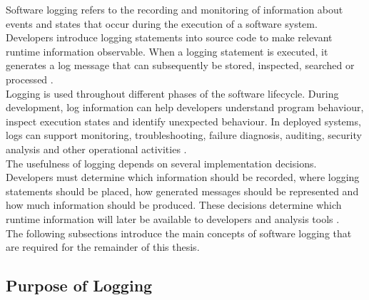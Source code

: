Software logging refers to the recording and monitoring of information about events and states that occur during the execution of a software system. 
Developers introduce logging statements into source code to make relevant runtime information observable.
When a logging statement is executed, it generates a log message that can subsequently be stored, inspected, searched or processed 
\cite{chen2021asurveyofsoftwareloginstrumentation}.
\\
Logging is used throughout different phases of the software lifecycle. During development, 
log information can help developers understand program behaviour, inspect execution states and identify unexpected behaviour. 
In deployed systems, logs can support monitoring, troubleshooting, failure diagnosis, auditing, security analysis
and other operational activities \cite{chen2021asurveyofsoftwareloginstrumentation,gu2023loggingpracticesinsoftwareengineering}.
\\
The usefulness of logging depends on several implementation decisions. 
Developers must determine which information should be recorded, where logging statements should be placed,
how generated messages should be represented and how much information should be produced. 
These decisions determine which runtime information will later be available to developers and analysis tools 
\cite{chen2021asurveyofsoftwareloginstrumentation,fu2014wheredodeveloperslog}.
\\
The following subsections introduce the main concepts of software logging that are required for the remainder of this thesis.

\subsection{Purpose of Logging}

